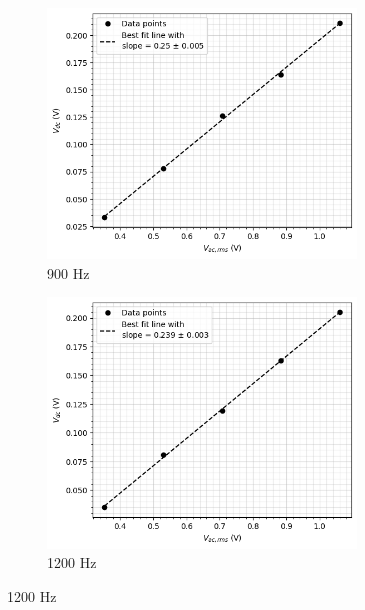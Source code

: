    \begin{figure}[H]
    \ContinuedFloat
    \begin{subfigure}{\linewidth}
    \includegraphics[width=0.9\textwidth]{images/d3.png}
    \caption{900 Hz}
    \end{subfigure}

    \begin{subfigure}{\linewidth}
    \includegraphics[width=0.9\textwidth]{images/d4.png}
    \caption{1200 Hz}
    \end{subfigure}
    
    \end{figure}
        
